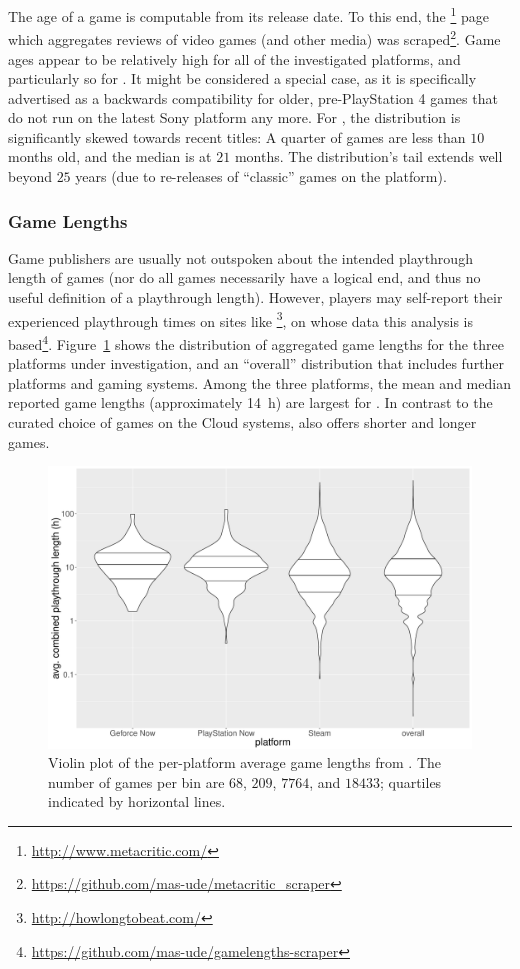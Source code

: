 The age of a game is computable from its release date. To this end, the \metacritic\footnote{\url{http://www.metacritic.com/}} page which aggregates reviews of video games (and other media) was scraped\footnote{\url{https://github.com/mas-ude/metacritic_scraper}}. Game ages appear to be relatively high for all of the investigated platforms, and particularly so for \psnow. It might be considered a special case, as it is specifically advertised as a backwards compatibility for older, pre-PlayStation 4 games that do not run on the latest Sony platform any more. For \steam, the distribution is significantly skewed towards recent titles: A quarter of games are less than $10$ months old, and the median is at $21$ months. The distribution's tail extends well beyond $25$ years (due to re-releases of ``classic'' games on the platform).


\subsubsection{Game Lengths}

Game publishers are usually not outspoken about the intended playthrough length of games (nor do all games necessarily have a logical end, and thus no useful definition of a playthrough length). However, players may self-report their experienced playthrough times on sites like \hltb\footnote{\url{http://howlongtobeat.com/}}, on whose data this analysis is based\footnote{\url{https://github.com/mas-ude/gamelengths-scraper}}.
Figure~\ref{fig:gamelengths-violin} shows the distribution of aggregated game lengths for the three platforms under investigation, and an ``overall'' distribution that includes further platforms and gaming systems. Among the three platforms, the mean and median reported game lengths (approximately \SI{14}{\hour}) are largest for \gfnow. In contrast to the curated choice of games on the Cloud systems, \steam also offers shorter and longer games.


\begin{figure}[!t]
	\centering
	\includegraphics[width=1.0\columnwidth]{images/gamelengths-by-platform-violin.pdf}
	\caption{Violin plot of the per-platform average game lengths from \hltb. The number of games per bin are $68$, $209$, $7764$, and $18433$; quartiles indicated by horizontal lines.}
\label{fig:gamelengths-violin}
\end{figure}



